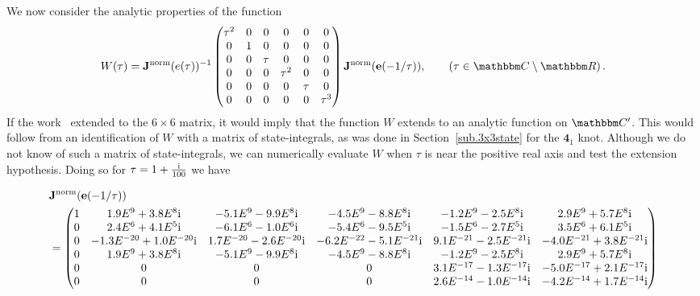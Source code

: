 \documentclass[12pt,reqno]{amsart}
\theoremstyle{definition}
\def\BR{\mathbbm R}
\def\BC{\mathbbm C}
\def\be{\begin{equation}}
\def\ee{\end{equation}}
\def\e{\bold e}
\def\ri{\mathrm{i}}
\def\ri{{\rm i}}
\def\bJ{\mathbf J}
\def\e{\bold e}
\def\md{\mathbf}
\newcommand{\knot}[1]{\md{#1}}
\begin{document}
We now consider the analytic properties of the function
\be
\label{W52}
W(\tau)=\bJ^{\mathrm{norm}}(e(\tau))^{-1}
\begin{pmatrix}
\tau^2 & 0 & 0 & 0 & 0 & 0\\
0 & 1 & 0 & 0 & 0 & 0\\
0 & 0 & \tau & 0 & 0 & 0\\
0 & 0 & 0 & \tau^2 & 0 & 0\\
0 & 0 & 0 & 0 & \tau & 0\\
0 & 0 & 0 & 0 & 0 & \tau^3
\end{pmatrix}
\bJ^{\mathrm{norm}}(\e(-1/\tau)), \qquad (\tau \in \BC\setminus\BR) \,.
\ee
If the work~\cite{GZ:qseries} extended to the $6 \times 6$ matrix, it would imply
that the function $W$ extends to an analytic function on $\BC'$. This would follow
from an identification of $W$ with a matrix of state-integrals, as was done in
Section~\ref{sub.3x3state} for the $\knot{4}_1$ knot. Although we do not know of such
a matrix of state-integrals, we can numerically evaluate $W$ when $\tau$ is near
the positive real axis and test the extension hypothesis. Doing so for 
$\tau=1+\frac{\ri}{100}$ we have
\begin{tiny}
\be
\begin{split}
&\bJ^{\mathrm{norm}}(\e(-1/\tau))\\&=
\begin{pmatrix}
  1 & 1.9E^{9} + 3.8E^{8}\ri & -5.1E^{9} - 9.9E^{8}\ri & -4.5E^{9} - 8.8E^{8}\ri
  & -1.2E^{9} - 2.5E^{8}\ri & 2.9E^{9} + 5.7E^{8}\ri\\
  0 & 2.4E^{6} + 4.1E^{5}\ri & -6.1E^{6} - 1.0E^{6}\ri & -5.4E^{6} - 9.5E^{5}\ri
  & -1.5E^{6} - 2.7E^{5}\ri & 3.5E^{6} + 6.1E^{5}\ri\\
  0 & -1.3E^{-20} + 1.0E^{-20}\ri & 1.7E^{-20} - 2.6E^{-20}\ri & -6.2E^{-22} - 5.1E^{-21}\ri
  & 9.1E^{-21} - 2.5E^{-21}\ri & -4.0E^{-21} + 3.8E^{-21}\ri\\
  0 & 1.9E^{9} + 3.8E^{8}\ri & -5.1E^{9} - 9.9E^{8}\ri & -4.5E^{9} - 8.8E^{8}\ri
  & -1.2E^{9} - 2.5E^{8}\ri & 2.9E^{9} + 5.7E^{8}\ri\\
0 & 0 & 0 & 0 & 3.1E^{-17} - 1.3E^{-17}\ri & -5.0E^{-17} + 2.1E^{-17}\ri\\
0 & 0 & 0 & 0 & 2.6E^{-14} - 1.0E^{-14}\ri & -4.2E^{-14} + 1.7E^{-14}\ri
\end{pmatrix}
\end{split}
\ee
\end{tiny}
\end{document}
